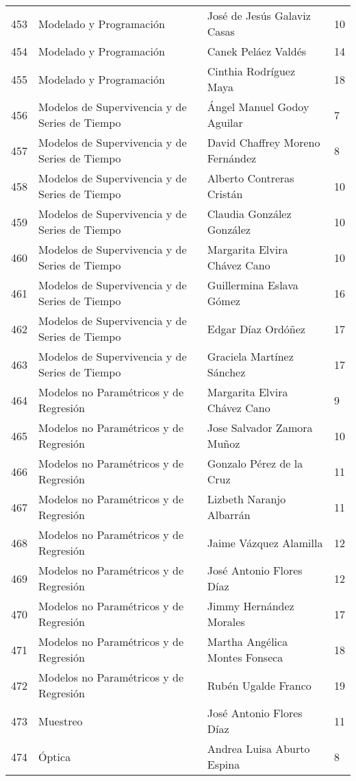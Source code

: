 \begin{table}[ht]
\begin{tabular}{rlll}
  453 & Modelado y Programación & José de Jesús Galaviz Casas & 10 \\ 
  454 & Modelado y Programación & Canek Peláez Valdés & 14 \\ 
  455 & Modelado y Programación & Cinthia Rodríguez Maya & 18 \\ 
  456 & Modelos de Supervivencia y de Series de Tiempo & Ángel Manuel Godoy Aguilar & 7 \\ 
  457 & Modelos de Supervivencia y de Series de Tiempo & David Chaffrey Moreno Fernández & 8 \\ 
  458 & Modelos de Supervivencia y de Series de Tiempo & Alberto Contreras Cristán & 10 \\ 
  459 & Modelos de Supervivencia y de Series de Tiempo & Claudia González González & 10 \\ 
  460 & Modelos de Supervivencia y de Series de Tiempo & Margarita Elvira Chávez Cano & 10 \\ 
  461 & Modelos de Supervivencia y de Series de Tiempo & Guillermina Eslava Gómez & 16 \\ 
  462 & Modelos de Supervivencia y de Series de Tiempo & Edgar Díaz Ordóñez & 17 \\ 
  463 & Modelos de Supervivencia y de Series de Tiempo & Graciela Martínez Sánchez & 17 \\ 
  464 & Modelos no Paramétricos y de Regresión & Margarita Elvira Chávez Cano & 9 \\ 
  465 & Modelos no Paramétricos y de Regresión & Jose Salvador Zamora Muñoz & 10 \\ 
  466 & Modelos no Paramétricos y de Regresión & Gonzalo Pérez de la Cruz & 11 \\ 
  467 & Modelos no Paramétricos y de Regresión & Lizbeth Naranjo Albarrán & 11 \\ 
  468 & Modelos no Paramétricos y de Regresión & Jaime Vázquez Alamilla & 12 \\ 
  469 & Modelos no Paramétricos y de Regresión & José Antonio Flores Díaz & 12 \\ 
  470 & Modelos no Paramétricos y de Regresión & Jimmy Hernández Morales & 17 \\ 
  471 & Modelos no Paramétricos y de Regresión & Martha Angélica Montes Fonseca & 18 \\ 
  472 & Modelos no Paramétricos y de Regresión & Rubén Ugalde Franco & 19 \\ 
  473 & Muestreo & José Antonio Flores Díaz & 11 \\ 
  474 & Óptica & Andrea Luisa Aburto Espina & 8 \\ 

\end{tabular}
\end{table}
